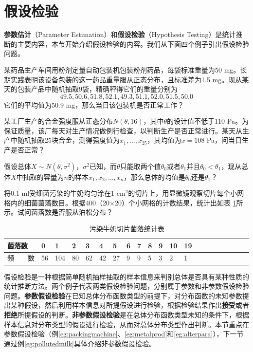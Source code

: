 \section{假设检验}
\textbf{参数估计}（Parameter Estimation）和\textbf{假设检验}（Hypothesis Testing）是统计推断的主要内容，本节开始介绍假设检验的内容。我们从下面四个例子引出假设检验问题。
\begin{example}\label{eg:packingmachine}
某药品生产车间用粉剂定量自动包装机包装粉剂药品，每袋标准重量为50 mg。长期实践表明该设备包装的这一药品重量服从正态分布，且标准差为1.5 mg。现从某天的包装产品中随机抽取9袋，精确秤得它们的重量分别为
\[49.5, 50.6, 51.8, 52.1, 49.3, 51.1, 52.0, 51.5, 50.0\]
它们的平均值为50.9 mg，那么当日该包装机是否正常工作？
\end{example}
\begin{example}\label{eg:metalprod}
某工厂生产的合金强度服从正态分布$N(\theta,16)$，其中$\theta$的设计值不低于110 Pa。为保证质量，该厂每天对生产情况做例行检查，以判断生产是否正常进行。某天从生产中随机抽取25块合金，测得强度值为$x_1,\ldots,x_25$，其均值为$\bar x=108$ Pa，问当日生产是否正常？
\end{example}
\begin{example}\label{eg:alterpara}
假设总体$X\sim N(\theta,\sigma^2)$，$\sigma^2$已知，而$\theta$只能取两个值$\theta_0$或者$\theta_1$并且$\theta_0<\theta_1$，现从总体$X$中抽取的容量为$n$的样本$x_1,x_2,\ldots,x_n$，那么总体的均值是$\theta_0$还是$\theta_1$？
\end{example}
\begin{example}\label{eg:pollutedmilk}
将0.1 ml受细菌污染的牛奶均匀涂在1 cm$^2$的切片上，用显微镜观察切片每个小网格内的细菌菌落数目。根据400（20$\times$20）个小网格的计数结果，统计出如表
\ref{tbl:pollutedmilk}所示。试问菌落数是否服从泊松分布？
\begin{table}[htbp]
    \caption{污染牛奶切片菌落统计表}
    \centering
    \begin{tabular}{|l|l|l|l|l|l|l|l|l|l|l|l|l|l|l|l|l|l|l|l|l|}
      \hline
       菌落数 & 0 & 1 & 2 & 3 & 4 & 5 & 6 & 7 & 8 & 9 & 10 & 19\\
      \hline
       频~~~~数 & 56 & 104 & 80 & 62 & 42 & 27 & 9 & 9 & 5 & 3 & 2 & 1\\
      \hline
    \end{tabular}
    \label{tbl:pollutedmilk}
\end{table}
\end{example}


假设检验是一种根据简单随机抽样抽取的样本信息来判别总体是否具有某种性质的统计推断方法。两个例子代表两类假设检验问题，分别属于参数和非参数假设检验问题。\textbf{参数假设检验}在已知总体分布函数类型的前提下，对分布函数的未知参数提出某种假设，然后利用样本信息对所提假设进行检验，根据检验结果作出\textbf{接受}或者\textbf{拒绝}所提假设的判断。\textbf{非参数假设检验}是在总体分布函数类型未知的条件下，根据样本信息对分布类型的假设进行检验，从而对总体分布类型作出判断。本节重点在参数假设检验（例\ref{eg:packingmachine}、\ref{eg:metalprod}和\ref{eg:alterpara}），下一节通过例\ref{eg:pollutedmilk}具体介绍非参数假设检验。

